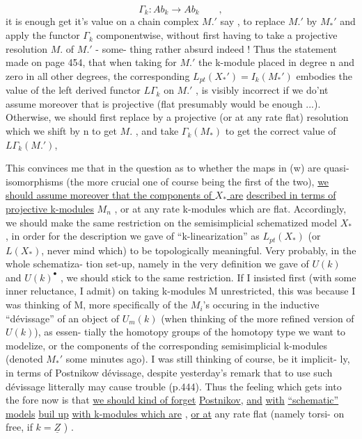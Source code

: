 
\[ \Gamma_k : Ab_k \to Ab_k \qquad , \]
it is enough\hand{,}  get it's value on a chain complex  $M.'$ say ,
to replace  $M.'$ by $M_*'$ and apply the functor $\Gamma_k$ componentwise,
without first having to take a projective resolution $M.$ of $M.'$ - some-%
thing rather absurd indeed ! Thus the statement made on page 454, that
when taking for $M.'$ the k-module \hand{$\pi$} placed in degree n and zero in all
other degrees, the corresponding $L_{pt}(X_*') = I_k(M_*')$ embodies the
value of the left derived functor $L\Gamma_k$ on $M.'$ , is visibly incorrect if
we do'nt assume moreover that \hand{$\pi$} is projective (flat presumably would be
enough ...). Otherwise, we should first replace \hand{$\pi$} by a projective
(or at any rate flat) resolution\hand{,} which we shift by n to get $M.$ , and 
take $\Gamma_k(M_*)$ to get the correct value of $L\Gamma_k(M.')$,

This convinces me that in the question as to whether the maps in (w)
are quasi-isomorphisms (the more crucial one of course being the first
of the two), \uline{we should assume moreover that the components of $X_*$ are}
\uline{described in terms of projective k-modules} $M_n$ , or at any rate k-modules
which are flat. Accordingly, we should make the same restriction on
the semisimplicial schematized model $X_*$ , in order for the description
we gave of ``k-linearization'' as $L_{pt}(X_*)$ (or $L(X_*)$, never mind which)
to be topologically meaningful. Very probably, in the whole schematiza-%
tion set-up, namely in the very definition we gave of $U(k)$ and $U(k)^\bullet$ ,
we should stick to the same restriction. If  I insisted
first (with some inner reluctance, I admit) on taking k-modules M
unrestricted, this was because I was thinking of M, more specifically
of the $M_i$'s occuring in the inductive ``dévissage'' of an object of
$U_m(k)$ (when thinking of the more refined version of $U(k)$), as essen-%
tially the homotopy groups of the homotopy type we want to modelize,
or  the components of the corresponding semisimplicial k-modules (denoted
$M_*'$ some minutes ago). I was still thinking of course, be it implicit-%
ly, in terms of Postnikow dévissage, despite yesterday's remark that
to use such dévissage litterally may cause trouble (p.444). Thus the
feeling which gets into the fore now is that \uline{we should kind of forget}
\uline{Postnikov}, \uline{and}   \uline{with} \uline{} \uline{``schematic''} \uline{models} \uline{buil up}
\uline{with k-modules which are} , \uline{or at} any rate flat (namely torsi-%
on free, if $k=\underline{Z}$ ) .

